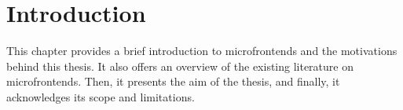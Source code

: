 \chapter{Introduction}
\label{chap:Introduction} 
This chapter provides a brief introduction to microfrontends and the motivations behind this thesis. It also offers an overview of the existing literature on microfrontends. Then, it presents the aim of the thesis, and finally, it acknowledges its scope and limitations.



